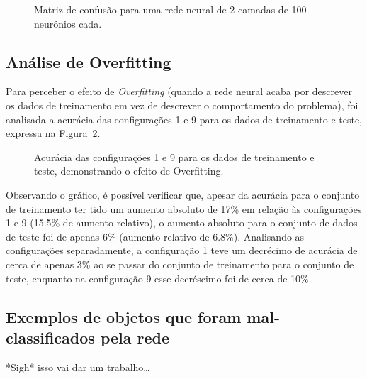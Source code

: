 \documentclass[twocolumn]{article}
\begin{document}
    \begin{figure}[ht]
        \centering{}
        \def\svgwidth{\columnwidth}
        
        \caption{%
            Matriz de confusão para uma rede neural de 2 camadas de 100
            neurônios cada.\label{conf-matrix}
        }
    \end{figure}

    \subsection{Análise de Overfitting}

    Para perceber o efeito de \textit{Overfitting} (quando a rede neural acaba
    por descrever os dados de treinamento em vez de descrever o comportamento
    do problema), foi analisada a acurácia das configurações 1 e 9 para os
    dados de treinamento e teste, expressa na Figura~\ref{overfitting}.

    \begin{figure}[ht]
        \centering{}
        \def\svgwidth{\columnwidth}
        
        \caption{%
            Acurácia das configurações 1 e 9 para os dados de treinamento e
            teste, demonstrando o efeito de Overfitting.\label{overfitting}
        }
    \end{figure}

    Observando o gráfico, é possível verificar que, apesar da acurácia para o
    conjunto de treinamento ter tido um aumento absoluto de 17\% em relação às
    configurações 1 e 9 (15.5\% de aumento relativo), o aumento absoluto para o
    conjunto de dados de teste foi de apenas 6\% (aumento relativo de 6.8\%).
    Analisando as configurações separadamente, a configuração 1 teve um
    decrécimo de acurácia de cerca de apenas 3\% ao se passar do conjunto de
    treinamento para o conjunto de teste, enquanto na configuração 9 esse
    decréscimo foi de cerca de 10\%.

    \subsection{Exemplos de objetos que foram mal-classificados pela rede}

    *Sigh* isso vai dar um trabalho\ldots

    
    
    \nocite{*}
\end{document}
